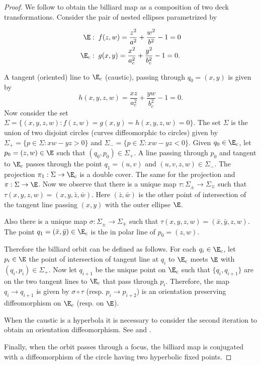  \begin{proof}
 We follow \cite{bry-2010} to obtain the billiard map as a composition of two deck transformations.  Consider the pair of nested   ellipses parametrized by
 
 \begin{align*}
     \E:&\;\; f(z,w)=\frac{z^2}{a^2}+\frac{w^2}{b^2}-1=0\\
     \E_c:&\;\; g(x,y)= \frac{x^2}{a_c^2}+\frac{y^2}{b_c^2}-1=0.
 \end{align*}
 
 A tangent (oriented) line to $\E_c$ (caustic), passing through $q_0=(x,y)$ is given by
 \[h(x,y,z,w) =\frac{xz}{a_c^2}+\frac{yw}{b_c^2}-1=0.\]
 Now consider the set
 $\Sigma= \{(x,y,z,w): f(z,w)=g(x,y)=h(x,y,z,w)=0\}.$  
 The set $\Sigma$ is the union of two disjoint circles (curves  diffeomorphic  to circles) given by
 $\Sigma_+=\{p\in \Sigma: xw-yz>0\} $ and
  $\Sigma_-=\{p\in \Sigma: xw-yz<0\}. $
  Given $q_0\in\E_c$, let $p_0=(z,w)\in \E$ such that $(q_0,p_0)\in\Sigma_+.$ A line passing through $p_0$ and tangent to $\E_c$ passes through the point $q_1=(u,v)$ and $(u,v,z,w)\in\Sigma_-.$ 
 The projection  $\pi_1:\Sigma \to \E_c$ is a double cover. The same for the projection
 and $\pi:\Sigma\to \E$. 
 Now we observe that there is a unique map $\tau:\Sigma_{\pm}\to \Sigma_{\mp}$ such that $\tau(x,y,z,w)=(x,y,\bar{z},\bar{w})$. Here $(\bar{z},\bar{w})$ is the other point of intersection of the tangent line passing $(x,y)$ with the outer ellipse $\E$.
 
Also there is a unique map $\sigma:\Sigma_{\pm}\to \Sigma_{\mp}$ such that $\tau(x,y,z,w)=( \bar{x},\bar{y},z,w)$. The point $q_1=( \bar{x},\bar{y})\in\E_c$ is the in polar line of $p_0=(z,w)$. 
 
 
 Therefore the billiard orbit can be defined as follows. For each $q_i\in \E_c$, let $p_i\in\E$ the point of intersection of tangent line at $q_i$ to $\E_c$ meets $\E$ with $(q_i,p_i)\in\Sigma_{+}$. Now let $q_{i+1}$ be the unique point on $\E_c$ such that $\{q_i,q_{i+1}\}$ are on the two tangent lines to $\E_c$ that pass through $p_i$. Therefore,   the map $q_i\to q_{i+1}$ is given by $\sigma\circ \tau$ (resp. $p_i\to p_{i+2}$) is an orientation preserving diffeomorphism on $\E_c$ (resp. on $\E$).

When the caustic is a hyperbola it is necessary to consider the second iteration to obtain an orientation diffeomorphism. See \cite{birkhoff1922} and \cite{kolod1985}.

Finally, when the orbit passes through a focus, the billiard map is conjugated with a diffeomorphism of the circle having two hyperbolic fixed points.
\end{proof}
 



